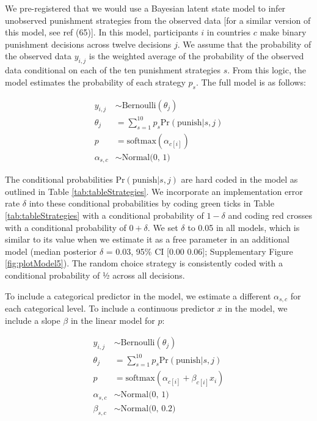 \documentclass[
  man, donotrepeattitle,floatsintext]{apa6}
\begin{document}
We pre-registered that we would use a Bayesian latent state model to infer
unobserved punishment strategies from the observed data {[}for a similar version
of this model, see ref (65){]}. In this model, participants \(i\) in
countries \(c\) make binary punishment decisions across twelve decisions \(j\). We
assume that the probability of the observed data \(y_{i,j}\) is the weighted
average of the probability of the observed data conditional on each of the ten
punishment strategies \(s\). From this logic, the model estimates the probability
of each strategy \(p_{s}\). The full model is as follows:

\begin{align}
y_{i,j} &\sim \text{Bernoulli}(\theta_{j}) \\
\theta_{j} &= \sum_{s=1}^{10} p_{s} \text{Pr}(\text{punish}|s,j) \nonumber \\
p &= \text{softmax}(\alpha_{c[i]}) \nonumber \\
\alpha_{s,c} &\sim \text{Normal(0, 1)} \nonumber
\end{align}

The conditional probabilities \(\text{Pr}(\text{punish}|s,j)\) are hard coded in
the model as outlined in Table \ref{tab:tableStrategies}. We incorporate an
implementation error rate \(\delta\) into these conditional probabilities by coding
green ticks in Table \ref{tab:tableStrategies} with a conditional probability
of \(1 - \delta\) and coding red crosses with a conditional probability of
\(0 + \delta\). We set \(\delta\) to 0.05 in all models, which is similar to its
value when we estimate it as a free parameter in an additional model (median
posterior \(\delta\) = 0.03, 95\% CI
{[}0.00 0.06{]};
Supplementary Figure \ref{fig:plotModel5}). The random choice strategy is
consistently coded with a conditional probability of ½ across all decisions.

To include a categorical predictor in the model, we estimate a different
\(\alpha_{s,c}\) for each categorical level. To include a continuous predictor
\(x\) in the model, we include a slope \(\beta\) in the linear model for \(p\):

\begin{align}
y_{i,j} &\sim \text{Bernoulli}(\theta_{j}) \\
\theta_{j} &= \sum_{s=1}^{10} p_{s} \text{Pr}(\text{punish}|s,j) \nonumber \\
p &= \text{softmax}(\alpha_{c[i]} + \beta_{c[i]}x_{i}) \nonumber \\
\alpha_{s,c} &\sim \text{Normal(0, 1)} \nonumber \\
\beta_{s,c} &\sim \text{Normal(0, 0.2)} \nonumber
\end{align}
\end{document}
